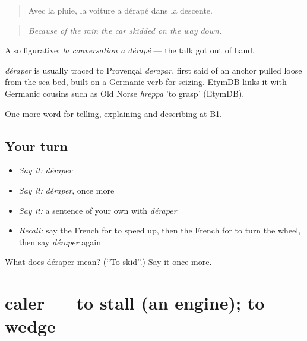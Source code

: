 \begin{quote}
Avec la pluie, la voiture a dérapé dans la descente.
\end{quote}

\begin{quote}
\emph{Because of the rain the car skidded on the way down.}
\end{quote}

Also figurative: \emph{la conversation a dérapé} — the talk got out of hand.

\begin{cousinweb}
\emph{déraper} is usually traced to Provençal \emph{derapar}, first said of an anchor pulled loose from the sea bed, built on a Germanic verb for seizing. EtymDB links it with Germanic cousins such as Old Norse \emph{hreppa} 'to grasp' (EtymDB).
\end{cousinweb}

\begin{grammarlens}[title={What you've built}]
One more word for telling, explaining and describing at B1.
\end{grammarlens}

\subsection*{Your turn}
\begin{itemize}
\raggedright
  \item \emph{Say it:} \emph{déraper}
  \item \emph{Say it:} \emph{déraper}, once more
  \item \emph{Say it:} a sentence of your own with \emph{déraper}
  \item \emph{Recall:} say the French for to speed up, then the French for to turn the wheel, then say \emph{déraper} again
\end{itemize}

\begin{tcolorbox}[breakable,colback=teal!4,colframe=teal!35!black,title={Before you move on}]
What does déraper mean? (\textquotedblleft{}To skid\textquotedblright{}.) Say it once more.
\end{tcolorbox}
\section[caler]{caler — to stall (an engine); to wedge}

\label{lesson:FR-C401-caler}



